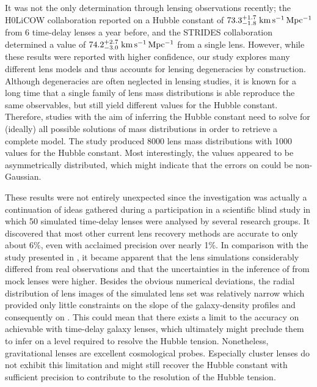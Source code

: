 It was not the only \Ho{} determination through lensing observations recently;
the H0LiCOW collaboration  reported on a Hubble constant of
$73.3^{+1.7}_{-1.8}\;\mathrm{km\,s^{-1}\,Mpc^{-1}}$ from 6 time-delay lenses a year before, and the
STRIDES collaboration  determined a value of
$74.2^{+2.7}_{-3.0}\;\mathrm{km\,s^{-1}\,Mpc^{-1}}$ from a single lens.  However, while these
results were reported with higher confidence, our study explores many different
lens models and thus accounts for lensing degeneracies by construction.
Although degeneracies are often neglected in lensing studies, it is known for a
long time that a single family of lens mass distributions is able reproduce the
same observables, but still yield different values for the Hubble constant.
Therefore, studies with the aim of inferring the Hubble constant need to solve
for (ideally) all possible solutions of mass distributions in order to retrieve
a complete model.  The study produced 8000 lens mass distributions with 1000
values for the Hubble constant.  Most interestingly, the values appeared to be
asymmetrically distributed, which might indicate that the errors on \Ho{} could
be non-Gaussian.  

These results were not entirely unexpected since the investigation was actually
a continuation of ideas gathered during a participation in a scientific blind
study  in which 50 simulated time-delay lenses were analysed by
several research groups.  It discovered that most other current lens recovery
methods are accurate to only about 6\%, even with acclaimed precision over
nearly 1\%.  In comparison with the study presented in , it became
apparent that the lens simulations considerably differed from real observations
and that the uncertainties in the inference of \Ho{} from mock lenses were
higher.  Besides the obvious numerical deviations, the radial distribution of
lens images of the simulated lens set was relatively narrow which provided only
little constraints on the slope of the galaxy-density profiles and consequently
on \Ho.  This could mean that there exists a limit to the accuracy on \Ho{}
achievable with time-delay galaxy lenses, which ultimately might preclude them
to infer \Ho{} on a level required to resolve the Hubble tension.  Nonetheless,
gravitational lenses are excellent cosmological probes. Especially cluster
lenses do not exhibit this limitation and might still recover the Hubble
constant with sufficient precision to contribute to the resolution of the Hubble
tension.

